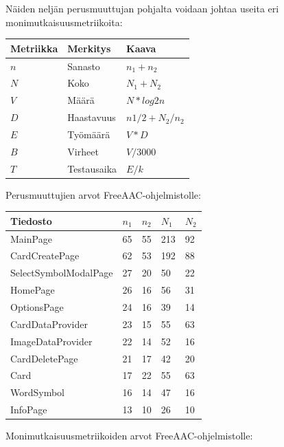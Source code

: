 \documentclass[utf8]{gradu3}
\begin{document}
Näiden neljän perusmuuttujan pohjalta voidaan johtaa useita eri monimutkaisuusmetriikoita:

\begin{center}
    \begin{tabular}{ | l | l | l |}
    \hline
    \textbf{Metriikka} & \textbf{Merkitys} & \textbf{Kaava} \\ \hline
    $n$ & Sanasto & $n_1 + n_2$ \\ \hline
    $N$ & Koko & $N_1 + N_2$ \\ \hline
    $V$ & Määrä & $N * log2 n$ \\ \hline
    $D$ & Haastavuus & $n1/2 + N_2/n_2$ \\ \hline
    $E$ & Työmäärä & $V * D$ \\ \hline
    $B$ & Virheet & $V / 3000$ \\ \hline
    $T$ & Testausaika & $E / k$ \\ \hline
    \end{tabular}
\end{center}

Perusmuuttujien arvot FreeAAC-ohjelmistolle:

\begin{center}
    \begin{tabular}{| l | l | l | l | l |}
    \hline
    \textbf{Tiedosto} & \textbf{$n_1$} & \textbf{$n_2$} & \textbf{$N_1$} & \textbf{$N_2$} \\ \hline
    MainPage & 65 & 55 & 213 & 92 \\ \hline
    CardCreatePage & 62 & 53 & 192 & 88 \\ \hline
    SelectSymbolModalPage & 27 & 20 & 50 & 22 \\ \hline
    HomePage & 26 & 16 & 56 & 31 \\ \hline
    OptionsPage & 24 & 16 & 39 & 14 \\ \hline
    CardDataProvider & 23 & 15 & 55 & 63 \\ \hline
    ImageDataProvider & 22 & 14 & 52 & 16 \\ \hline
    CardDeletePage & 21 & 17 & 42 & 20 \\ \hline
    Card & 17 & 22 & 55 & 63 \\ \hline
    WordSymbol & 16 & 14 & 47 & 16 \\ \hline
    InfoPage & 13 & 10 & 26 & 10 \\ \hline
    \end{tabular}
\end{center}

Monimutkaisuusmetriikoiden arvot FreeAAC-ohjelmistolle:
\end{document}
